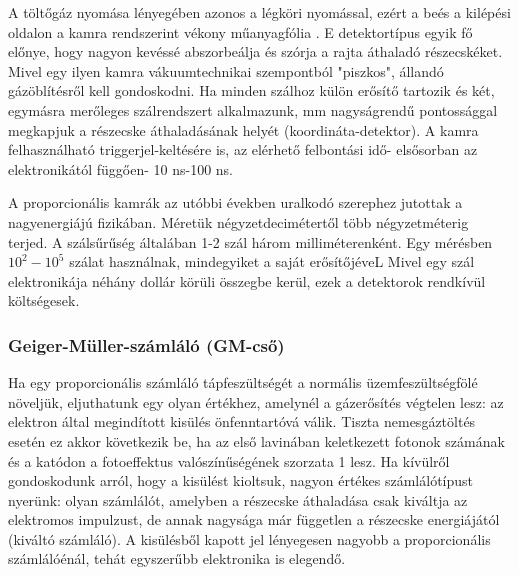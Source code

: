 \documentclass[../main.tex]{subfiles}
\begin{document}
A töltőgáz nyomása lényegében azonos a légköri nyomással, ezért a beés a kilépési oldalon a kamra rendszerint vékony műanyagfólia . E detektortípus egyik fő előnye,
hogy nagyon kevéssé abszorbeálja és szórja a rajta áthaladó részecskéket. Mivel egy ilyen kamra vákuumtechnikai szempontból
"piszkos", állandó gázöblítésről kell gondoskodni. Ha minden szálhoz külön erősítő tartozik és két, egymásra merőleges szálrendszert alkalmazunk,
mm nagyságrendű pontossággal megkapjuk a részecske áthaladásának helyét (koordináta-detektor). A kamra felhasználható triggerjel-keltésére is, az
elérhető felbontási idő- elsősorban az elektronikától függően- 10 ns-100 ns.

A proporcionális kamrák az utóbbi években uralkodó szerephez jutottak
a nagyenergiájú fizikában. Méretük négyzetdecimétertől több négyzetméterig terjed. A szálsűrűség általában 1-2 szál három milliméterenként. Egy
mérésben $10^2 -10^5$ szálat használnak, mindegyiket a saját erősítőjéveL Mivel egy szál elektronikája néhány dollár körüli összegbe kerül, ezek a detektorok rendkívül költségesek.

\subsubsection*{Geiger-Müller-számláló (GM-cső)}
Ha egy proporcionális számláló tápfeszültségét a normális üzemfeszültségfölé növeljük, eljuthatunk egy olyan értékhez, amelynél a gázerősítés végtelen lesz: az elektron által megindított kisülés önfenntartóvá válik. Tiszta
nemesgáztöltés esetén ez akkor következik be, ha az első lavinában keletkezett fotonok számának és a katódon a fotoeffektus valószínűségének szorzata
1 lesz. Ha kívülről gondoskodunk arról, hogy a kisülést kioltsuk, nagyon értékes számlálótípust nyerünk: olyan számlálót, amelyben a részecske áthaladása csak kiváltja az elektromos impulzust, de annak nagysága már
független a részecske energiájától (kiváltó számláló). A kisülésből kapott jel lényegesen nagyobb a proporcionális számlálóénál, tehát egyszerűbb elektronika is elegendő.
\end{document}
